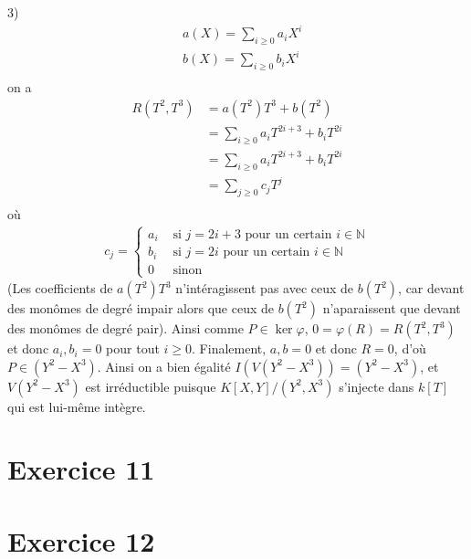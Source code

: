\begin{question}{3)}
            \begin{align*}
                &a(X) = \sum_{i \geq 0} a_i X^i \\
                &b(X) = \sum_{i \geq 0} b_i X^i \\
            \end{align*}
            on a 
            \begin{align*}
                R(T^2, T^3) &= a(T^2)T^3 + b(T^2) \\
                &= \sum_{i \geq 0} a_i T^{2i + 3} + b_i T^{2i} \\
                &= \sum_{i \geq 0} a_i T^{2i + 3} + b_i T^{2i} \\
                &= \sum_{j \geq 0} c_j T^j \\
            \end{align*}
            où
            \begin{align*}
                c_j =
                \begin{cases}
                    a_i &\text{ si } j = 2i + 3 \text{ pour un certain } i \in \mathbb{N} \\
                    b_i &\text{ si } j = 2i \text{ pour un certain } i \in \mathbb{N} \\
                    0 & \text{ sinon}
                \end{cases}
            \end{align*}
            (Les coefficients de $a(T^2)T^3$ n'intéragissent pas avec ceux de $b(T^2)$, car devant des monômes de degré impair alors que ceux de $b(T^2)$ n'aparaissent que devant des monômes de degré pair). Ainsi comme $P \in \ker \varphi$, $0 = \varphi(R) = R(T^2, T^3)$ et donc $a_i, b_i = 0$ pour tout $i \geq 0$. Finalement, $a,b = 0$ et donc $R = 0$, d'où $P \in (Y^2 - X^3)$. Ainsi on a bien égalité $I(V(Y^2 - X^3)) = (Y^2 - X^3)$, et $V(Y^2 - X^3)$ est irréductible puisque $K[X,Y]/(Y^2 , X^3)$ s'injecte dans $k[T]$ qui est lui-même intègre.
        \end{question}

    \section{Exercice 11}
    
    \section{Exercice 12}

